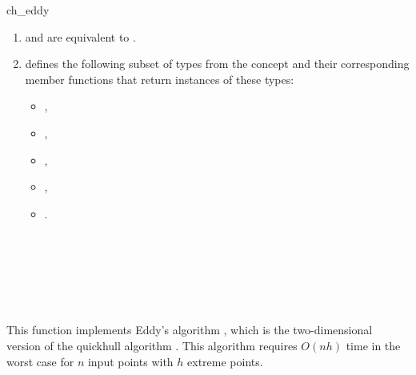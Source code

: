 \begin{ccRefFunction}{ch_eddy}
\begin{enumerate}
   \item    {} and 
            are equivalent to .
   \item    {} defines the following subset of types from
            the concept  and their corresponding member
            functions that return instances of these types:
            \begin{itemize}
                \item {},
		\item {},
                \item {},
                \item {}, 
                \item {}.
            \end{itemize}
\end{enumerate}

\ccSeeAlso

 \\
 \\
 \\
 \\
 \\

\ccImplementation

This function implements Eddy's algorithm 
\cite{e-nchap-77}, which  is the two-dimensional version of the quickhull
algorithm \cite{bdh-qach-96}%
. 
This algorithm requires $O(n h)$ time 
in the worst case for $n$ input points with $h$ extreme points.  

\end{ccRefFunction}



